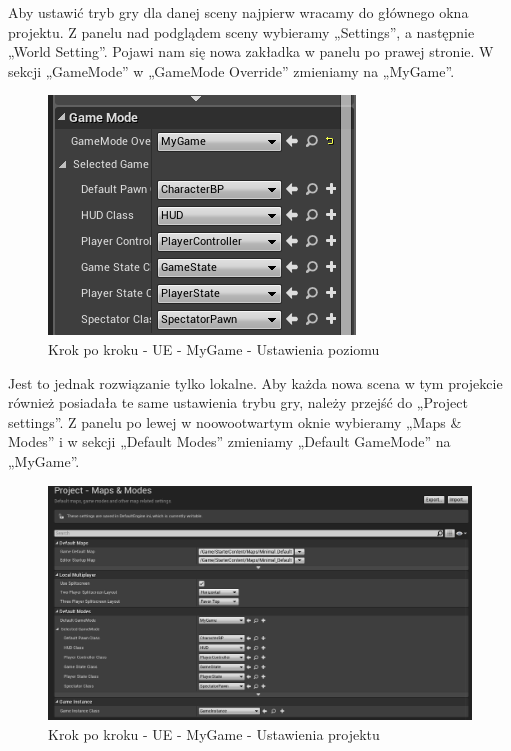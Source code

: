 \documentclass[12pt]{xmgr}
\begin{document}
\newpage
Aby ustawić tryb gry dla danej sceny najpierw wracamy do głównego okna projektu. Z panelu nad podglądem sceny wybieramy „Settings”, a następnie „World Setting”. Pojawi nam się nowa zakładka w panelu po prawej stronie. W sekcji „GameMode” w „GameMode Override” zmieniamy na „MyGame”.

\begin{figure}[!htb]
    \begin{center}
    \includegraphics[scale=0.35]{Screeny/UeKrokPoKroku/UE-MyGame-WorldSetting.png}
    \end{center}
    \caption{Krok po kroku - UE -  MyGame - Ustawienia poziomu}
\end{figure}

Jest to jednak rozwiązanie tylko lokalne. Aby każda nowa scena w tym projekcie również posiadała te same ustawienia trybu gry, należy przejść do „Project settings”. Z panelu po lewej w noowootwartym oknie wybieramy „Maps \& Modes” i w sekcji „Default Modes” zmieniamy „Default GameMode” na „MyGame”.

\begin{figure}[!htb]
    \begin{center}
    \includegraphics[scale=0.35]{Screeny/UeKrokPoKroku/UE-MyGame-ProjectSettings.png}
    \end{center}
    \caption{Krok po kroku - UE -  MyGame - Ustawienia projektu}
\end{figure}
\end{document}
